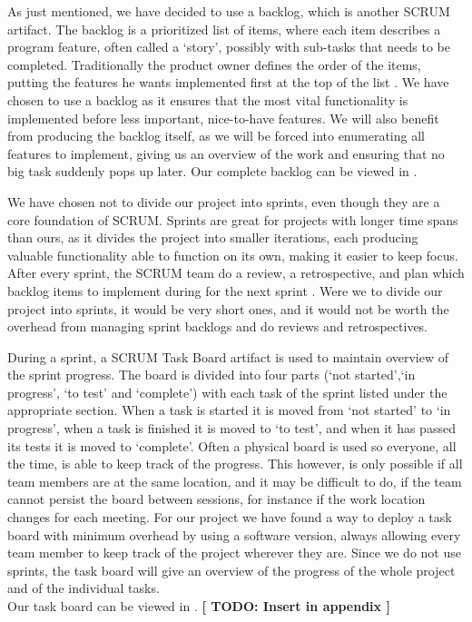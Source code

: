 As just mentioned, we have decided to use a backlog, which is another SCRUM artifact.
The backlog is a prioritized list of items, where each item describes a program feature, often called a `story', possibly with sub-tasks that needs to be completed. Traditionally the product owner defines the order of the items, putting the features he wants implemented first at the top of the list \cite[p. 12]{scrum-org-guide}.
We have chosen to use a backlog as it ensures that the most vital functionality is implemented before less important, nice-to-have features. We will also benefit from producing the backlog itself, as we will be forced into enumerating all features to implement, giving us an overview of the work and ensuring that no big task suddenly pops up later.
Our complete backlog can be viewed in .

We have chosen not to divide our project into sprints, even though they are a core foundation of SCRUM.
Sprints are great for projects with longer time spans than ours, as it divides the project into smaller iterations, each producing valuable functionality able to function on its own, making it easier to keep focus.
After every sprint, the SCRUM team do a review, a retrospective, and plan which backlog items to implement during for the next sprint \cite[p. 8]{scrum-org-guide}.
Were we to divide our project into sprints, it would be very short ones, and it would not be worth the overhead from managing sprint backlogs and do reviews and retrospectives.

During a sprint, a SCRUM Task Board artifact is used to maintain overview of the sprint progress. The board is divided into four parts (`not started',`in progress', `to test' and `complete') with each task of the sprint listed under the appropriate section.
When a task is started it is moved from `not started' to `in progress', when a task is finished it is moved to `to test', and when it has passed its tests it is moved to `complete'.
Often a physical board is used so everyone, all the time, is able to keep track of the progress. This however, is only possible if all team members are at the same location, and it may be difficult to do, if the team cannot persist the board between sessions, for instance if the work location changes for each meeting.
For our project we have found a way to deploy a task board with minimum overhead by using a software version, always allowing every team member to keep track of the project wherever they are. Since we do not use sprints, the task board will give an overview of the progress of the whole project and of the individual tasks.\\
Our task board can be viewed in . \textbf{[ TODO: Insert in appendix ]}

